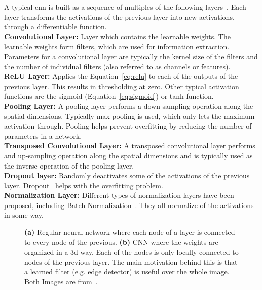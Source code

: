 A typical \gls{cnn} is built as a sequence of multiples of the following layers~\cite{KarpathyStanfordRecognition}. Each layer transforms the activations of the previous layer into new activations, through a differentiable function.\\
\textbf{Convolutional Layer:} Layer which contains the learnable weights. The learnable weights form filters, which are used for information extraction. Parameters for a convolutional layer are typically the kernel size of the filters and the number of individual filters (also referred to as channels or features).\\
\textbf{ReLU Layer:} Applies the Equation~\ref{eq:relu} to each of the outputs of the previous layer. This results in thresholding at zero. Other typical activation functions are the sigmoid (Equation~\ref{eq:sigmoid}) or tanh function.\\
\textbf{Pooling Layer:} A pooling layer performs a down-sampling operation along the spatial dimensions. Typically max-pooling is used, which only lets the maximum activation through. Pooling helps prevent overfitting by reducing the number of parameters in a network.\\
\textbf{Transposed Convolutional Layer:} A transposed convolutional layer performs and up-sampling operation along the spatial dimensions and is typically used as the inverse operation of the pooling layer.\\
\textbf{Dropout layer:} Randomly deactivates some of the activations of the previous layer. Dropout~\cite{Srivastava2014Dropout:Overfitting} helps with the overfitting problem.\\
\textbf{Normalization Layer:} Different types of normalization layers have been proposed, including Batch Normalization~\cite{SergeyIoffe2015BatchNormalization}. They all normalize of the activations in some way.
 
\begin{figure}[htbp]
	\centering
	\hfill
	\caption[Sections of MRN sequences]{\textbf{(a)} Regular neural network where each node of a layer is connected to every node of the previous. \textbf{(b)} CNN where the weights are organized in a \gls{3d} way. Each of the nodes is only locally connected to nodes of the previous layer. The main motivation behind this is that a learned filter (e.g. edge detector) is useful over the whole image. Both Images are from~\cite{KarpathyStanfordRecognition}.}
	\label{fig:mlearn_nn_cnn}  
\end{figure}


